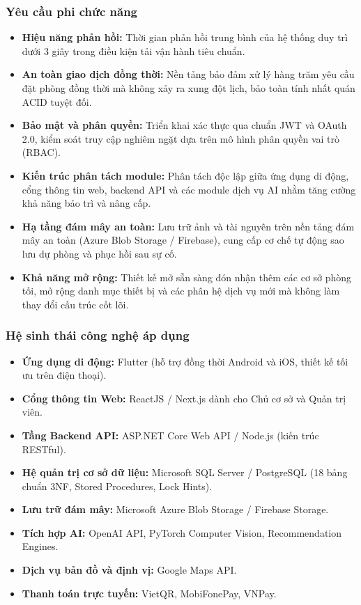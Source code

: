 \subsubsection{Yêu cầu phi chức năng}
\begin{itemize}[leftmargin=2em]
    \item \textbf{Hiệu năng phản hồi:} Thời gian phản hồi trung bình của hệ thống duy trì dưới 3 giây trong điều kiện tải vận hành tiêu chuẩn.
    \item \textbf{An toàn giao dịch đồng thời:} Nền tảng bảo đảm xử lý hàng trăm yêu cầu đặt phòng đồng thời mà không xảy ra xung đột lịch, bảo toàn tính nhất quán ACID tuyệt đối.
    \item \textbf{Bảo mật và phân quyền:} Triển khai xác thực qua chuẩn JWT và OAuth 2.0, kiểm soát truy cập nghiêm ngặt dựa trên mô hình phân quyền vai trò (RBAC).
    \item \textbf{Kiến trúc phân tách module:} Phân tách độc lập giữa ứng dụng di động, cổng thông tin web, backend API và các module dịch vụ AI nhằm tăng cường khả năng bảo trì và nâng cấp.
    \item \textbf{Hạ tầng đám mây an toàn:} Lưu trữ ảnh và tài nguyên trên nền tảng đám mây an toàn (Azure Blob Storage / Firebase), cung cấp cơ chế tự động sao lưu dự phòng và phục hồi sau sự cố.
    \item \textbf{Khả năng mở rộng:} Thiết kế mở sẵn sàng đón nhận thêm các cơ sở phòng tối, mở rộng danh mục thiết bị và các phân hệ dịch vụ mới mà không làm thay đổi cấu trúc cốt lõi.
\end{itemize}

\subsubsection{Hệ sinh thái công nghệ áp dụng}
\begin{itemize}[leftmargin=2em]
    \item \textbf{Ứng dụng di động:} Flutter (hỗ trợ đồng thời Android và iOS, thiết kế tối ưu trên điện thoại).
    \item \textbf{Cổng thông tin Web:} ReactJS / Next.js dành cho Chủ cơ sở và Quản trị viên.
    \item \textbf{Tầng Backend API:} ASP.NET Core Web API / Node.js (kiến trúc RESTful).
    \item \textbf{Hệ quản trị cơ sở dữ liệu:} Microsoft SQL Server / PostgreSQL (18 bảng chuẩn 3NF, Stored Procedures, Lock Hints).
    \item \textbf{Lưu trữ đám mây:} Microsoft Azure Blob Storage / Firebase Storage.
    \item \textbf{Tích hợp AI:} OpenAI API, PyTorch Computer Vision, Recommendation Engines.
    \item \textbf{Dịch vụ bản đồ và định vị:} Google Maps API.
    \item \textbf{Thanh toán trực tuyến:} VietQR, MobiFonePay, VNPay.
\end{itemize}

